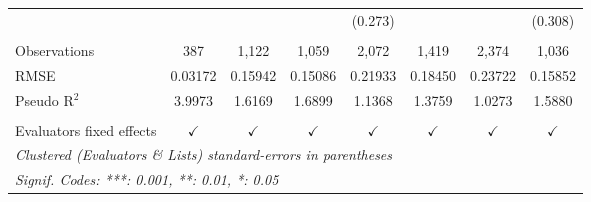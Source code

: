 \begin{tabular}{lccccccc}
                            &               &               &               & (0.273)       &               &               & (0.308)\\   
    \\
   Observations             & 387           & 1,122         & 1,059         & 2,072         & 1,419         & 2,374         & 1,036\\  
   RMSE                     & 0.03172       & 0.15942       & 0.15086       & 0.21933       & 0.18450       & 0.23722       & 0.15852\\  
   Pseudo R$^2$             & 3.9973        & 1.6169        & 1.6899        & 1.1368        & 1.3759        & 1.0273        & 1.5880\\  
    \\
   Evaluators fixed effects & $\checkmark$  & $\checkmark$  & $\checkmark$  & $\checkmark$  & $\checkmark$  & $\checkmark$  & $\checkmark$\\   
   \bottomrule
   \multicolumn{8}{l}{\emph{Clustered (Evaluators \& Lists) standard-errors in parentheses}}\\
   \multicolumn{8}{l}{\emph{Signif. Codes: ***: 0.001, **: 0.01, *: 0.05}}\\
\end{tabular}
\par\endgroup


